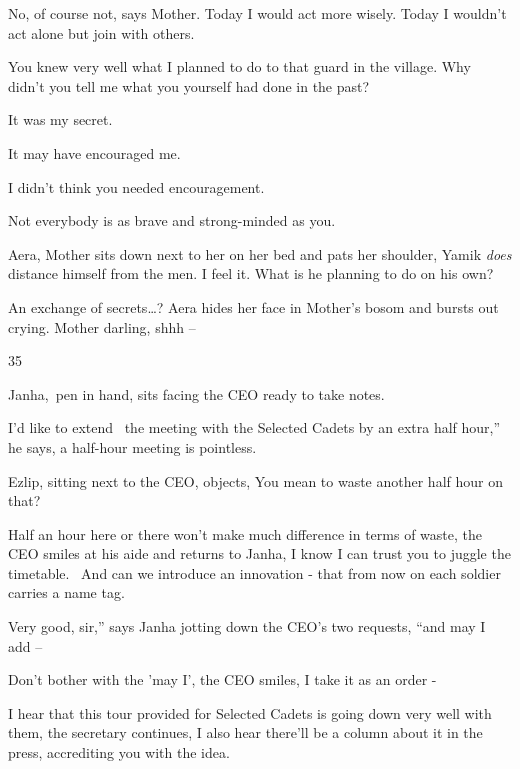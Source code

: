 \documentclass[12pt]{book}
\begin{document}
{\textquotedbl}No, of course not,{\textquotedbl} says Mother. {\textquotedbl}Today I would act more wisely. Today I
wouldn't act alone but join with others.{\textquotedbl}

{\textquotedbl}You knew very well what I planned to do to that guard in the village. Why didn't you tell me what you
yourself had done in the past?{\textquotedbl}

{\textquotedbl}It was my secret.{\textquotedbl}

{\textquotedbl}It may have encouraged me.{\textquotedbl}

{\textquotedbl}I didn't think you needed encouragement.{\textquotedbl}

{\textquotedbl}Not everybody is as brave and strong-minded as you.{\textquotedbl}

{\textquotedbl}Aera,{\textquotedbl} Mother sits down next to her on her bed and pats her shoulder, {\textquotedbl}Yamik
\textit{does} distance himself from the men. I feel it. What is he planning to do on his own?{\textquotedbl}

{\textquotedbl}An exchange of secrets{\dots}?{\textquotedbl} Aera hides her face in Mother's bosom and bursts out
crying. {\textquotedbl}Mother darling, shhh --{\textquotedbl}


\bigskip

35

Janha,~pen in hand, sits facing the CEO ready to take notes.

{\textquotedbl}I'd like to extend \ the meeting with the Selected Cadets by an extra half hour,'' he says,
{\textquotedbl}a half-hour meeting is pointless.{\textquotedbl}{ }

Ezlip, sitting next to the CEO, objects, {\textquotedbl}You mean to waste another half hour on that?{\textquotedbl}

{\textquotedbl}Half an hour here or there won't make much difference in terms of waste,{\textquotedbl} the CEO smiles at
his aide and returns to Janha, {\textquotedbl}I know I can trust you to juggle the timetable. ~And can we introduce an
innovation - that from now on each soldier{ }carries a name tag.{\textquotedbl}

{\textquotedbl}Very good, sir,'' says Janha jotting down the CEO's two requests, ``and may I add --{\textquotedbl}

{\textquotedbl}Don't bother with the 'may I',{\textquotedbl} the CEO smiles, {\textquotedbl}I take it{
}as an order -{\textquotedbl}

{\textquotedbl}I hear that this tour provided for Selected Cadets is going down very well with them,{\textquotedbl} the
secretary continues, {\textquotedbl}I also hear there'll be a column about it in the press, accrediting you with the
idea.{\textquotedbl}
\end{document}
